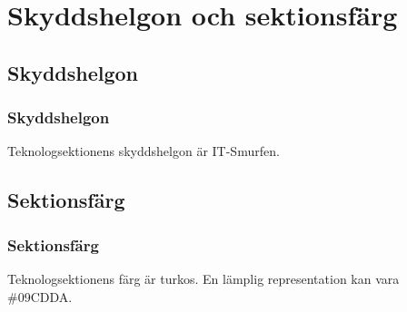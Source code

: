 \section{Skyddshelgon och sektionsfärg}

\subsection{Skyddshelgon}

\subsubsection{Skyddshelgon}
Teknologsektionens skyddshelgon är IT-Smurfen.

\subsection{Sektionsfärg}

\subsubsection{Sektionsfärg}
Teknologsektionens färg är turkos. En lämplig representation kan vara \#09CDDA.